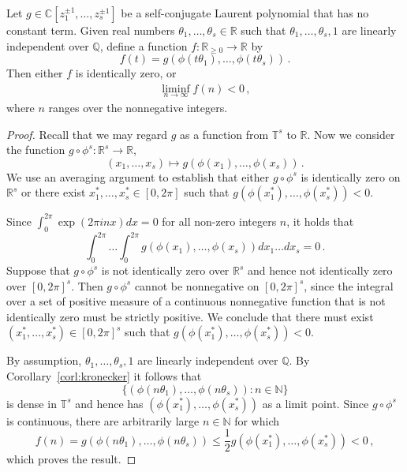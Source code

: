 \begin{proposition}
\label{first}
Let $g \in \mathbb{C}[z^{\pm 1}_1,\ldots,z^{\pm 1}_s]$ be a
self-conjugate Laurent polynomial that has no constant term.
Given real numbers $\theta_1,\ldots,\theta_s \in \mathbb{R}$ such that
$\theta_1,\ldots,\theta_s,1$ are linearly independent over
$\mathbb{Q}$, define a function
$f:\mathbb{R}_{\geq 0}\rightarrow \mathbb{R}$ by
\[ f(t) = g(\phi(t\theta_1),\ldots,\phi(t\theta_s)) \, .\]
Then either $f$ is identically zero, or
\begin{align*}
\liminf\limits_{n\rightarrow\infty} f(n) < 0 \, ,
\end{align*}
where $n$ ranges over the nonnegative integers.
\end{proposition}
\begin{proof}
  Recall that we may regard $g$ as a function from
$\mathbb{T}^s$ to $\mathbb{R}$.  Now we consider the
  function $g \circ \phi^s : \mathbb{R}^s \rightarrow \mathbb{R}$,
  \[ (x_1,\ldots,x_s) \mapsto g(\phi(x_1),\ldots,\phi(x_s)) \, . \] We
  use an averaging argument to establish that either $g\circ\phi^s$ is
  identically zero on $\mathbb{R}^s$ or there exist
  $x_1^*,\ldots,x_s^* \in [0,2\pi]$ such that
  $g(\phi(x_1^*),\ldots,\phi(x_s^*))<0$.

  Since $\int_0^{2\pi} \exp(2\pi i n x) dx=0$ for all non-zero
  integers $n$, it holds that
\begin{equation*}
\int_0^{2\pi} \ldots \int_0^{2\pi}
g(\phi(x_1),\ldots,\phi(x_s))
dx_1 \ldots dx_s =0 \, .
\end{equation*}
%
Suppose that
$g\circ \phi^s$ is not identically zero over
$\mathbb{R}^s$ and hence not identically zero over $[0,2\pi]^{s}$.
Then $g\circ \phi^s$ cannot be nonnegative on $[0,2\pi]^{s}$, since
the integral over a set of positive measure of a continuous
nonnegative function that is not identically zero must be strictly
positive.  We conclude that there must exist
$(x_1^*,\ldots,x_s^*) \in [0,2\pi]^{s}$ such that
$g(\phi(x_1^*),\ldots,\phi(x_s^*))<0$.

By assumption, $\theta_1,\ldots,\theta_s,1$ are linearly
independent over $\mathbb{Q}$.  By Corollary~\ref{corl:kronecker} it
follows that
\[ \{ (\phi(n\theta_1),\ldots,\phi(n\theta_s)) : n \in
  \mathbb{N} \} \] is dense in $\mathbb{T}^s$ and hence has
$(\phi(x_1^*),\ldots,\phi(x_s^*))$ as a limit point.
Since $g\circ\phi^s$ is continuous, there are
arbitrarily large $n\in\mathbb{N}$ for which
\[
f(n) = g(\phi(n\theta_1),\ldots,\phi(n\theta_s))
    \leq \textstyle\frac{1}{2} g(\phi(x_1^*),\ldots,\phi(x_s^*)) < 0 \, , \]
which proves the result.
\end{proof}

